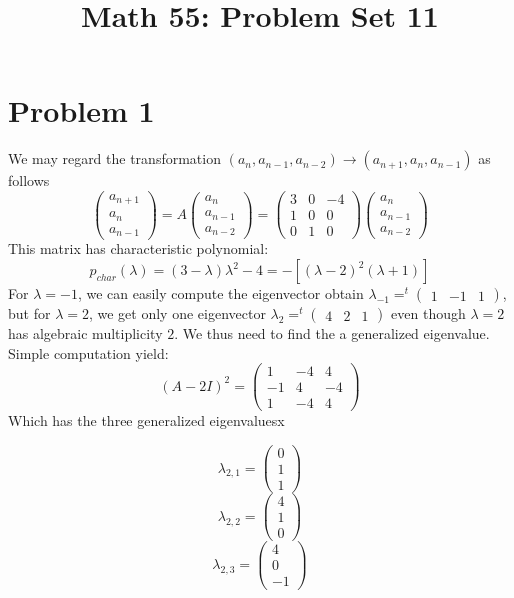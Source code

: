\title{Math 55: Problem Set 11}

\maketitle
\section*{Problem 1}
We may regard the transformation $(a_n, a_{n-1}, a_{n-2})\to (a_{n+1}, a_n, a_{n-1})$ 
as follows 
\[ \begin{pmatrix}
a_{n+1}\\a_n\\a_{n-1}
\end{pmatrix} = A\begin{pmatrix}
a_n\\a_{n-1}\\a_{n-2}
\end{pmatrix}=\begin{pmatrix}
3&0&-4\\
1&0& 0\\
0&1&0
\end{pmatrix} \begin{pmatrix}
a_n\\a_{n-1}\\a_{n-2}
\end{pmatrix} \]
This matrix has characteristic polynomial: 
\[ p_{char}(\lambda) = (3-\lambda)\lambda^2 - 4 = -[(\lambda-2)^2(\lambda+1)] \]
For $\lambda=-1$, we can easily compute the eigenvector obtain $\lambda_{-1}=^t\begin{pmatrix}
1&-1&1
\end{pmatrix}$, but for $\lambda=2$, we get only one eigenvector $\lambda_{2}=^t\begin{pmatrix}
4&2&1
\end{pmatrix}$ even though $\lambda=2$ has algebraic multiplicity $2$. We thus need to find the a generalized eigenvalue. Simple computation yield:
\[ (A-2I)^2 = \begin{pmatrix}
1&-4&4\\ -1&4&-4\\1&-4&4
\end{pmatrix}  \]
Which has the three generalized eigenvaluesx
\begin{multicols}{3}
\noindent
\[
\lambda_{2,1} = \begin{pmatrix}
0\\1\\1
\end{pmatrix}
\]
\[
\lambda_{2,2} = \begin{pmatrix}
4\\1\\0
\end{pmatrix}
\]
\[\lambda_{2,3} = \begin{pmatrix}
4\\0\\-1
\end{pmatrix}
\]
\end{multicols}
